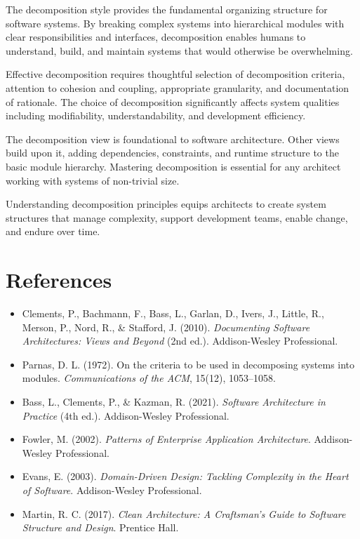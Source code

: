 \documentclass[11pt]{article}
\begin{document}
The decomposition style provides the fundamental organizing structure for software systems. By breaking complex systems into hierarchical modules with clear responsibilities and interfaces, decomposition enables humans to understand, build, and maintain systems that would otherwise be overwhelming.

Effective decomposition requires thoughtful selection of decomposition criteria, attention to cohesion and coupling, appropriate granularity, and documentation of rationale. The choice of decomposition significantly affects system qualities including modifiability, understandability, and development efficiency.

The decomposition view is foundational to software architecture. Other views build upon it, adding dependencies, constraints, and runtime structure to the basic module hierarchy. Mastering decomposition is essential for any architect working with systems of non-trivial size.

Understanding decomposition principles equips architects to create system structures that manage complexity, support development teams, enable change, and endure over time.

\section*{References}

\begin{itemize}
  \item Clements, P., Bachmann, F., Bass, L., Garlan, D., Ivers, J., Little, R., Merson, P., Nord, R., \& Stafford, J. (2010). \textit{Documenting Software Architectures: Views and Beyond} (2nd ed.). Addison-Wesley Professional.
  \item Parnas, D. L. (1972). On the criteria to be used in decomposing systems into modules. \textit{Communications of the ACM}, 15(12), 1053--1058.
  \item Bass, L., Clements, P., \& Kazman, R. (2021). \textit{Software Architecture in Practice} (4th ed.). Addison-Wesley Professional.
  \item Fowler, M. (2002). \textit{Patterns of Enterprise Application Architecture}. Addison-Wesley Professional.
  \item Evans, E. (2003). \textit{Domain-Driven Design: Tackling Complexity in the Heart of Software}. Addison-Wesley Professional.
  \item Martin, R. C. (2017). \textit{Clean Architecture: A Craftsman's Guide to Software Structure and Design}. Prentice Hall.
\end{itemize}

\listoffigures
\end{document}
